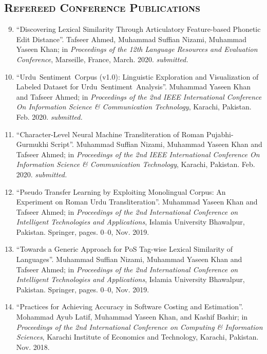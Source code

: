 \documentclass[a4paper, 10pt]{article}
\begin{document}
\subsection*{\normalfont\textsc{Refereed Conference Publications}}
\begin{enumerate}
\setcounter{enumi}{8}
\itemsep-4pt 
\item ``Discovering Lexical Similarity Through Articulatory Feature-based Phonetic Edit Distance''. Tafseer Ahmed, Muhammad Suffian Nizami, Muhammad Yaseen Khan; in \emph{Proceedings of the 12th Language Resources and Evaluation Conference}, Marseille, France, March. 2020. \emph{\small submitted.}

\item ``Urdu~Sentiment~Corpus (v1.0): Linguistic Exploration and Visualization of Labeled Dataset for Urdu~Sentiment~Analysis''. Muhammad Yaseen Khan and Tafseer Ahmed; in \emph{Proceedings of the 2nd IEEE International Conference On Information Science \& Communication Technology}, Karachi, Pakistan. Feb. 2020. \emph{\small submitted.}

\item ``Character-Level Neural Machine Transliteration of Roman Pujabhi-Gurmukhi Script''. Muhammad Suffian Nizami, Muhammad Yaseen Khan and Tafseer Ahmed; in \emph{Proceedings of the 2nd IEEE International Conference On Information Science \& Communication Technology}, Karachi, Pakistan. Feb. 2020. \emph{\small submitted.}

 \item ``Pseudo Transfer Learning by Exploiting Monolingual Corpus: An Experiment on Roman Urdu Transliteration''. Muhammad Yaseen Khan and Tafseer Ahmed; in \emph{Proceedings of the 2nd International Conference on Intelligent Technologies and Applications}, Islamia University Bhawalpur, Pakistan. Springer,  pages. 0--0, Nov. 2019.
 
  \item ``Towards a Generic Approach for PoS Tag-wise Lexical Similarity of Languages''. Muhammad Suffian Nizami, Muhammad Yaseen Khan and Tafseer Ahmed; in \emph{Proceedings of the 2nd International Conference on Intelligent Technologies and Applications}, Islamia University Bhawalpur, Pakistan. Springer,  pages. 0--0, Nov. 2019.
  
  \item ``Practices for Achieving Accuracy in Software Costing and Estimation''. Mohammad Ayub Latif, Muhammad Yaseen Khan, and Kashif Bashir; in \emph{Proceedings of the 2nd International Conference on Computing \& Information Sciences}, Karachi Institute of Economics and Technology, Karachi, Pakistan. Nov. 2018.
  

\end{enumerate}
\end{document}
